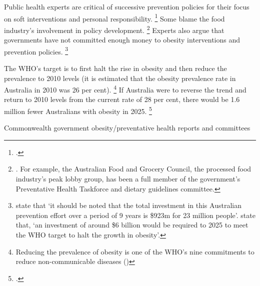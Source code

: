\documentclass[embargoed]{grattan}
\begin{document}
Public health experts are critical of successive prevention policies for their focus on soft interventions and personal responsibility.%
\footcites{Capacci2012Policiespromotehealthy}{Swinburn2013Progressobesityprevention}{Australia2015NoTimeWeight} Some blame the food industry's involvement in policy development.%
\footnote{\textcites{Swinburn2013Progressobesityprevention}{Roberto2015Patchyprogressobesity}{Brownell2009perilsignoringhistory}.
For example, the Australian Food and Grocery Council, the processed food industry's peak lobby group, has been a full member of the government's Preventative Health Taskforce and dietary guidelines committee.} Experts also argue that governments have not committed enough money to obesity interventions and prevention policies.%
\footnote{\textcite{Swinburn2013Progressobesityprevention} state that `it should be noted that the total investment in this Australian prevention effort over a period of 9 years is \$923m for 23 million people'. \textcite{Australia2015NoTimeWeight} state that, `an investment of around \$6 billion would be required to 2025 to meet the WHO target to halt the growth in obesity'.}

The WHO's target is to first halt the rise in obesity and then reduce the prevalence to 2010 levels (it is estimated that the obesity prevalence rate in Australia in 2010 was 26 per cent).%
\footnote{Reducing the prevalence of obesity is one of the WHO's nine commitments to reduce non-communicable diseases (\textcites{Organization2013GlobalActionPlan}{Organization2016ObesityoverweightFact})} If Australia were to reverse the trend and return to 2010 levels from the current rate of 28 per cent, there would be 1.6 million fewer Australians with obesity in 2025.%
\footcite{Australia2015NoTimeWeight}

\begin{table}
\caption{Commonwealth government obesity/preventative health reports and committees}



\end{table}
\end{document}
